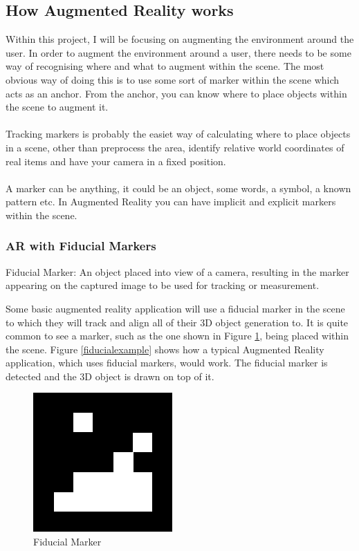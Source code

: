\documentclass[11pt]{article}
\begin{document}
\subsection{How Augmented Reality works}
Within this project, I will be focusing on augmenting the environment around
the user. 
In order to augment the environment around a user, there needs to be some
way of recognising where and what to augment within the scene. The most
obvious way of doing this is to use some sort of marker within the scene
which acts as an anchor. From the anchor, you can know where to place objects
within the scene to augment it. \\
\\
Tracking markers is probably the easiet 
way of calculating 
where to place objects in a scene, other than preprocess the area, identify
relative world coordinates of real items and have your camera in a fixed
position. \\
\\
A marker can be anything, it could be an object, some words, a symbol, a
known pattern etc. In Augmented Reality you can have implicit and explicit 
markers within the scene. 

\subsubsection{AR with Fiducial Markers}
\begin{center}
	Fiducial Marker: An object placed into view of a camera, resulting in
	the marker appearing on the captured image to be used for tracking
	or measurement.
\end{center}

Some basic augmented reality application will use a fiducial marker in
the scene to which they will track and align all of their 3D object 
generation to. It is quite common to see a marker, such as the one shown in 
Figure \ref{fiducial}, being placed within the scene. Figure
\ref{fiducialexample} shows how a typical Augmented Reality application,
which uses fiducial markers, would work. The fiducial marker is detected
and the 3D object is drawn on top of it.\\

\begin{figure}[!h]
	\centering
	\includegraphics[scale=0.8]{pics/fiducial.png}
	\caption{Fiducial Marker}
	\label{fiducial}
\end{figure}
\end{document}
